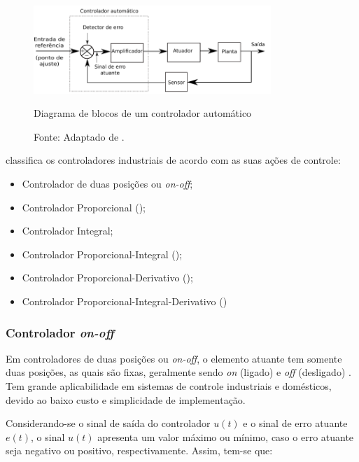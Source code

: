 \begin{figure}[h!]
 \centering
 \captionsetup{width=0.8\textwidth,font=footnotesize,textfont=bf}
 \includegraphics[width=0.8\textwidth,height=0.5\textheight,keepaspectratio]{figuras/Controlador.png}
 \caption{Diagrama de blocos de um controlador automático \label{fig:controlador}}
 \vspace{-0.2cm}
 \caption*{Fonte: Adaptado de \cite[p.18]{ogata}.}
\end{figure}

 classifica os controladores industriais de acordo com as suas ações de controle:
\begin{itemize}
 \item Controlador de duas posições ou \textit{on-off}; %
 \item Controlador Proporcional ();
 \item Controlador Integral;
 \item Controlador Proporcional-Integral ();
 \item Controlador Proporcional-Derivativo ();
 \item Controlador Proporcional-Integral-Derivativo ()
\end{itemize}

\subsubsection{Controlador \textit{on-off}}

Em controladores de duas posições ou \textit{on-off}, o elemento atuante tem somente duas posições, as quais são fixas, geralmente sendo 
\textit{on} (ligado) e \textit{off} (desligado) \cite{ogata}. Tem grande aplicabilidade em sistemas de controle industriais e 
domésticos, devido ao baixo custo e simplicidade de implementação.

Considerando-se o sinal de saída do controlador $u(t)$ %
e o sinal de erro atuante $e(t)$, o sinal $u(t)$ apresenta um valor máximo ou mínimo, caso o erro atuante seja negativo ou positivo, 
respectivamente. Assim, tem-se que:

